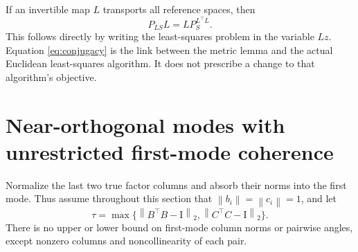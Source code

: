 \documentclass[11pt]{article}
\theoremstyle{remark}\newtheorem{remark}[theorem]{Remark}
\newcommand{\norm}[1]{\left\lVert#1\right\rVert}
\newcommand{\Id}{\mathrm I}
\begin{document}
If an invertible map $L$ transports all reference spaces, then
\begin{equation}\label{eq:conjugacy}
 P_{LS}L=LP_S^{L^\top L}.
\end{equation}
This follows directly by writing the least-squares problem in the variable $Lz$. Equation \eqref{eq:conjugacy} is the link between the metric lemma and the actual Euclidean least-squares algorithm. It does not prescribe a change to that algorithm's objective.

\section{Near-orthogonal modes with unrestricted first-mode coherence}
Normalize the last two true factor columns and absorb their norms into the first mode. Thus assume throughout this section that $\norm{b_i}=\norm{c_i}=1$, and let
\[
 \tau=\max\{\norm{B^\top B-\Id}_2,\norm{C^\top C-\Id}_2\}.
\]
There is no upper or lower bound on first-mode column norms or pairwise angles, except nonzero columns and noncollinearity of each pair.
\end{document}
